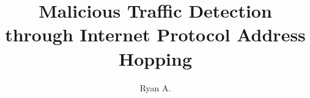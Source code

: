 \documentclass[]{afit-etd}
\title  {Malicious Traffic Detection through Internet Protocol Address Hopping}
\author          {Ryan A.}{Morehart}
\begin{document}
\listofacronyms{
	
}

\makePrefatoryPages 

\acresetall








\appendix







\end{document}
